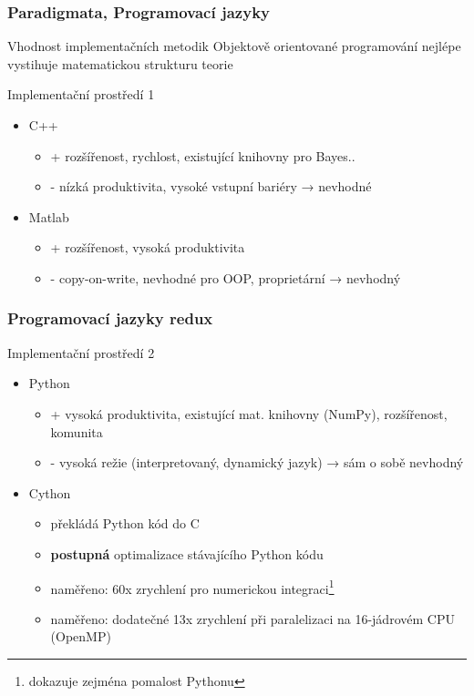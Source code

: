 \documentclass[12pt]{beamer}
\begin{document}
\begin{frame}
	\frametitle{Paradigmata, Programovací jazyky}

	\begin{block}{Vhodnost implementačních metodik}
		Objektově orientované programování nejlépe vystihuje matematickou strukturu teorie
	\end{block}

	\begin{block}{Implementační prostředí 1}
		\begin{itemize}
			\item C++
			\begin{itemize}
				\item + rozšířenost, rychlost, existující knihovny pro Bayes..
				\item - nízká produktivita, vysoké vstupní bariéry → nevhodné
			\end{itemize}
			\item Matlab
			\begin{itemize}
				\item + rozšířenost, vysoká produktivita
				\item - copy-on-write, nevhodné pro OOP, proprietární → nevhodný
			\end{itemize}
		\end{itemize}
	\end{block}
\end{frame}

\begin{frame}
	\frametitle{Programovací jazyky redux}

	\begin{block}{Implementační prostředí 2}
		\begin{itemize}
			\item Python
			\begin{itemize}
				\item + vysoká produktivita, existující mat. knihovny (NumPy), rozšířenost, komunita
				\item - vysoká režie (interpretovaný, dynamický jazyk) → sám o sobě nevhodný
			\end{itemize}
			\item Cython
			\begin{itemize}
				\item překládá Python kód do C
				\item \textbf{postupná} optimalizace stávajícího Python kódu
				\item naměřeno: 60x zrychlení pro numerickou integraci\footnote{dokazuje zejména
pomalost Pythonu}
				\item naměřeno: dodatečné 13x zrychlení při paralelizaci na 16-jádrovém CPU (OpenMP)
			\end{itemize}
		\end{itemize}
	\end{block}
\end{frame}
\end{document}
